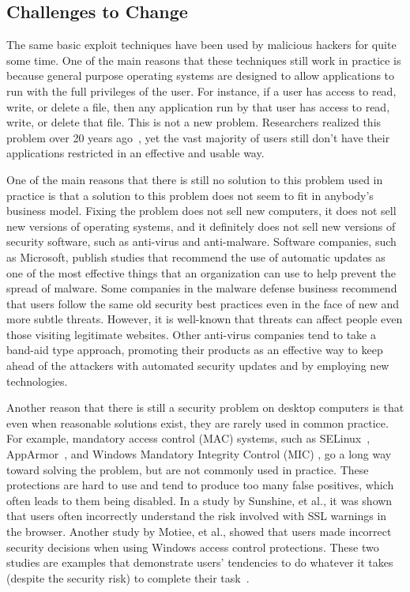 \subsection{Challenges to Change}

The same basic exploit techniques have been used by malicious hackers for quite some time. One of the main reasons that these techniques still work in practice is because general purpose operating systems are designed to allow applications to run with the full privileges of the user. For instance, if a user has access to read, write, or delete a file, then any application run by that user has access to read, write, or delete that file. This is not a new problem. Researchers realized this problem over 20 years ago~\cite{Lai_88}, yet the vast majority of users still don't have their applications restricted in an effective and usable way.

One of the main reasons that there is still no solution to this problem used in practice is that a solution to this problem does not seem to fit in anybody's business model. Fixing the problem does not sell new computers, it does not sell new versions of operating systems, and it definitely does not sell new versions of security software, such as anti-virus and anti-malware. Software companies, such as Microsoft, publish studies that recommend the use of automatic updates as one of the most effective things that an organization can use to help prevent the spread of malware\cite{MS_SIR_2009}. Some companies in the malware defense business recommend that users follow the same old security best practices\cite{cto_roundtable_malware_defense_2010} even in the face of new and more subtle threats. However, it is well-known that threats can affect people even those visiting legitimate websites\cite{NewYork_Times_2009}. Other anti-virus companies tend to take a band-aid type approach, promoting their products as an effective way to keep ahead of the attackers with automated security updates and by employing new technologies\cite{Enterprise_IT_Planet_2009}.

Another reason that there is still a security problem on desktop computers is that even when reasonable solutions exist, they are rarely used in common practice. For example, mandatory access control (MAC) systems, such as SELinux~\cite{loscocco_2001}, AppArmor~\cite{AppArmor_2006}, and Windows Mandatory Integrity Control (MIC) \cite{mandatory_integrity_control}, go a long way toward solving the problem, but are not commonly used in practice. These protections are hard to use\cite{umip_li_2007} and tend to produce too many false positives, which often leads to them being disabled. In a study by Sunshine, et al., it was shown that users often incorrectly understand the risk involved with SSL warnings in the browser. Another study by Motiee, et al., showed that users made incorrect security decisions when using Windows access control protections\cite{motiee_chi_2010}. These two studies are examples that demonstrate users' tendencies to do whatever it takes (despite the security risk) to complete their task~\cite{sunshine_wolf_2009}.

